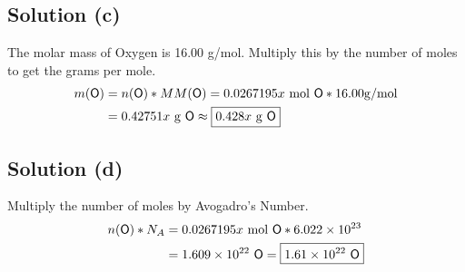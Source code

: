 \documentclass[10pt]{article}
\begin{document}
        \subsection{Solution (c)}
            The molar mass of Oxygen is 16.00 \unit{\gram/\mole}.
            Multiply this by the number of moles to get the grams per mole.
            \begin{align}
                m(\ce{O})   &=  n(\ce{O}) * MM(\ce{O})
                    =   0.0267195x\ \unit{\mole}\ \ce{O} * 16.00 \unit{\gram/\mole}\\
                    &=  0.42751x\ \unit{\gram}\ \ce{O}
                    \approx \boxed{0.428x\ \unit{\gram}\ \ce{O}}
            \end{align}

        \subsection{Solution (d)}
            Multiply the number of moles by Avogadro's Number.
            \begin{align}
                n(\ce{O}) * N_A &=  0.0267195x\ \unit{\mole}\ \ce{O} * 6.022 \times 10^{23}\\
                    &=  1.609 \times 10^{22}\ \ce{O}
                    =   \boxed{1.61 \times 10^{22}\ \ce{O}}
            \end{align}
\end{document}
